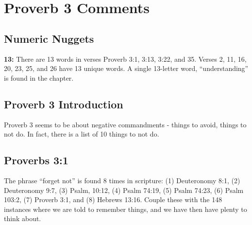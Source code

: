\section{Proverb 3 Comments}

\subsection{Numeric Nuggets}
\textbf{13:} There are 13 words in verses Proverb 3:1, 3:13,  3:22, and 35.  Verses 2, 11, 16, 20, 23, 25, and 26 have 13 unique words. A single 13-letter word, ``understanding'' is found in the chapter.

\subsection{Proverb 3 Introduction}
Proverb 3 seems to be about negative commandments - things to avoid, things to not do. In fact, there is a list of 10 things to not do.

\subsection{Proverbs 3:1}
The phrase ``forget not'' is found 8 times in scripture: (1) Deuteronomy 8:1, (2) Deuteronomy 9:7, (3) Psalm, 10:12, (4) Psalm 74:19, (5) Psalm 74:23, (6) Psalm 103:2, (7) Proverb 3:1, and (8) Hebrews 13:16. Couple these with the 148 instances where we are told to remember things, and we have then have plenty to think about.
